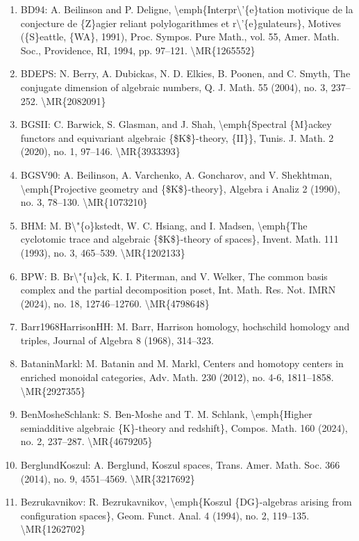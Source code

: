 \documentclass[11pt]{article}
\begin{document}
\begin{enumerate}[leftmargin=*]
  \item BD94: A. Beilinson and P. Deligne, \textbackslash{}emph\{Interpr\textbackslash{}'\{e\}tation motivique de la conjecture de \{Z\}agier reliant polylogarithmes et r\textbackslash{}'\{e\}gulateurs\}, Motives (\{S\}eattle, \{WA\}, 1991), Proc. Sympos. Pure Math., vol. 55, Amer. Math. Soc., Providence, RI, 1994, pp. 97--121. \textbackslash{}MR\{1265552\}
  \item BDEPS: N. Berry, A. Dubickas, N. D. Elkies, B. Poonen, and C. Smyth, The conjugate dimension of algebraic numbers, Q. J. Math. 55 (2004), no. 3, 237--252. \textbackslash{}MR\{2082091\}
  \item BGSII: C. Barwick, S. Glasman, and J. Shah, \textbackslash{}emph\{Spectral \{M\}ackey functors and equivariant algebraic \{\$K\$\}-theory, \{II\}\}, Tunis. J. Math. 2 (2020), no. 1, 97--146. \textbackslash{}MR\{3933393\}
  \item BGSV90: A. Beilinson, A. Varchenko, A. Goncharov, and V. Shekhtman, \textbackslash{}emph\{Projective geometry and \{\$K\$\}-theory\}, Algebra i Analiz 2 (1990), no. 3, 78--130. \textbackslash{}MR\{1073210\}
  \item BHM: M. B\textbackslash{}"\{o\}kstedt, W. C. Hsiang, and I. Madsen, \textbackslash{}emph\{The cyclotomic trace and algebraic \{\$K\$\}-theory of spaces\}, Invent. Math. 111 (1993), no. 3, 465--539. \textbackslash{}MR\{1202133\}
  \item BPW: B. Br\textbackslash{}"\{u\}ck, K. I. Piterman, and V. Welker, The common basis complex and the partial decomposition poset, Int. Math. Res. Not. IMRN (2024), no. 18, 12746--12760. \textbackslash{}MR\{4798648\}
  \item Barr1968HarrisonHH: M. Barr, Harrison homology, hochschild homology and triples, Journal of Algebra 8 (1968), 314--323.
  \item BataninMarkl: M. Batanin and M. Markl, Centers and homotopy centers in enriched monoidal categories, Adv. Math. 230 (2012), no. 4-6, 1811--1858. \textbackslash{}MR\{2927355\}
  \item BenMosheSchlank: S. Ben-Moshe and T. M. Schlank, \textbackslash{}emph\{Higher semiadditive algebraic \{K\}-theory and redshift\}, Compos. Math. 160 (2024), no. 2, 237--287. \textbackslash{}MR\{4679205\}
  \item BerglundKoszul: A. Berglund, Koszul spaces, Trans. Amer. Math. Soc. 366 (2014), no. 9, 4551--4569. \textbackslash{}MR\{3217692\}
  \item Bezrukavnikov: R. Bezrukavnikov, \textbackslash{}emph\{Koszul \{DG\}-algebras arising from configuration spaces\}, Geom. Funct. Anal. 4 (1994), no. 2, 119--135. \textbackslash{}MR\{1262702\}

\end{enumerate}
\end{document}
